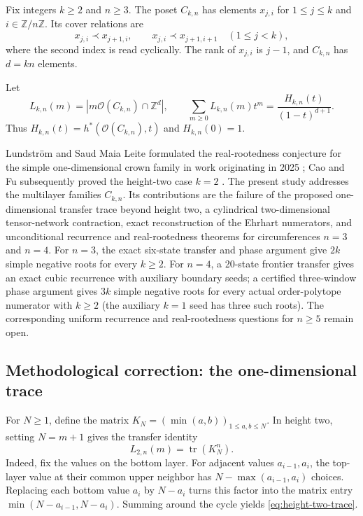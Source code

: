 \documentclass[11pt,a4paper]{article}
\theoremstyle{definition}
\begin{document}
Fix integers $k\ge2$ and $n\ge3$. The poset $C_{k,n}$ has elements $x_{j,i}$ for $1\le j\le k$ and $i\in\mathbb{Z}/n\mathbb{Z}$. Its cover relations are
\begin{equation}
x_{j,i}\prec x_{j+1,i},\qquad x_{j,i}\prec x_{j+1,i+1}
\quad (1\le j<k),
\end{equation}
where the second index is read cyclically. The rank of $x_{j,i}$ is $j-1$, and $C_{k,n}$ has $d=kn$ elements.

Let
\begin{equation}
L_{k,n}(m)=|m\mathcal{O}(C_{k,n})\cap\mathbb{Z}^{d}|,
\qquad
\sum_{m\ge0}L_{k,n}(m)t^m=\frac{H_{k,n}(t)}{(1-t)^{d+1}}.
\end{equation}
Thus $H_{k,n}(t)=h^*(\mathcal{O}(C_{k,n}),t)$ and $H_{k,n}(0)=1$.

Lundström and Saud Maia Leite formulated the real-rootedness conjecture
for the simple one-dimensional crown family in work originating in 2025
\cite{LundstromLeite2026}; Cao and Fu subsequently proved the height-two
case $k=2$ \cite{CaoFu2026}. The present study addresses the multilayer
families $C_{k,n}$. Its contributions are the failure of the proposed
one-dimensional transfer trace beyond height two, a cylindrical
two-dimensional tensor-network contraction, exact reconstruction of the
Ehrhart numerators, and unconditional recurrence and real-rootedness
theorems for circumferences $n=3$ and $n=4$. For $n=3$, the exact
six-state transfer and phase argument give $2k$ simple negative roots
for every $k\ge2$. For $n=4$, a 20-state frontier transfer gives an
exact cubic recurrence with auxiliary boundary seeds; a certified
three-window phase argument gives $3k$ simple negative roots for every
actual order-polytope numerator with $k\ge2$ (the auxiliary $k=1$ seed
has three such roots). The corresponding uniform recurrence and
real-rootedness questions for $n\ge5$ remain open.

\subsection{Methodological correction: the one-dimensional trace}

For $N\ge1$, define the matrix $K_N=(\min(a,b))_{1\le a,b\le N}$. In height two, setting $N=m+1$ gives the transfer identity
\begin{equation}\label{eq:height-two-trace}
L_{2,n}(m)=\operatorname{tr}(K_N^n).
\end{equation}
Indeed, fix the values on the bottom layer. For adjacent values $a_{i-1},a_i$, the top-layer value at their common upper neighbor has $N-\max(a_{i-1},a_i)$ choices. Replacing each bottom value $a_i$ by $N-a_i$ turns this factor into the matrix entry $\min(N-a_{i-1},N-a_i)$. Summing around the cycle yields \eqref{eq:height-two-trace}.
\end{document}
